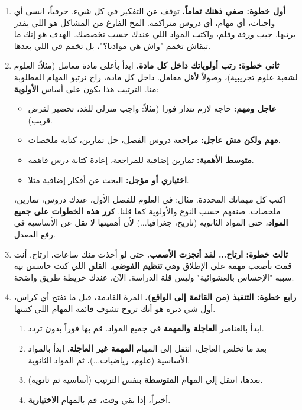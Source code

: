 \documentclass[12pt,a4paper]{book}
\begin{document}
	\begin{enumerate}
		\item \textbf{أول خطوة: صفي ذهنك تماماً.}
		توقف عن التفكير في كل شيء. حرفياً، انسى أي واجبات، أي مهام، أي دروس متراكمة. المخ الفارغ من المشاكل هو اللي يقدر يرتبها. جيب ورقة وقلم، واكتب المواد اللي عندك حسب تخصصك. الهدف هو إنك ما تبقاش تخمم "واش هي موادنا؟"، بل تخمم في اللي بعدها.
		
		\item \textbf{ثاني خطوة: رتب أولوياتك داخل كل مادة.}
		ابدأ بأعلى مادة معامل (مثلاً: العلوم لشعبة علوم تجريبية)، وصولاً لأقل معامل. داخل كل مادة، راح نرتبو المهام المطلوبة منا. الترتيب هذا يكون على أساس \textbf{الأولوية}:
		\begin{itemize}
			\item \textbf{عاجل ومهم:} حاجة لازم تتدار فورا (مثلاً: واجب منزلي للغد، تحضير لفرض قريب).
			\item \textbf{مهم ولكن مش عاجل:} مراجعة دروس الفصل، حل تمارين، كتابة ملخصات.
			\item \textbf{متوسط الأهمية:} تمارين إضافية للمراجعة، إعادة كتابة درس فاهمه.
			\item \textbf{اختياري أو مؤجل:} البحث عن أفكار إضافية مثلا.
		\end{itemize}
		اكتب كل مهماتك المحددة. مثال: في العلوم للفصل الأول، عندك دروس، تمارين، ملخصات. صنفهم حسب النوع والأولوية كما قلنا. \textbf{كرر هذه الخطوات على جميع المواد}، حتى المواد الثانوية (تاريخ، جغرافيا...) لأن أهميتها لا تقل عن الأساسية في رفع المعدل.
		
		\item \textbf{ثالث خطوة: ارتاح... لقد أنجزت الأصعب.}
		حتى لو أخذت منك ساعات، ارتاح. أنت قمت بأصعب مهمة على الإطلاق وهي \textbf{تنظيم الفوضى}. القلق اللي كنت حاسس بيه سببه "الإحساس بالعشوائية" وليس قلة الدراسة. الآن، عندك خريطة طريق واضحة.
		
		\item \textbf{رابع خطوة: التنفيذ (من القائمة إلى الواقع).}
		المرة القادمة، قبل ما تفتح أي كراس، أول شي ديره هو أنك تروح تشوف قائمة المهام اللي كتبتها.
		\begin{enumerate}
			\item ابدأ بالعناصر \textbf{العاجلة والمهمة} في جميع المواد. قم بها فوراً بدون تردد.
			\item بعد ما تخلص العاجل، انتقل إلى المهام \textbf{المهمة غير العاجلة}. ابدأ بالمواد الأساسية (علوم، رياضيات...)، ثم المواد الثانوية.
			\item بعدها، انتقل إلى المهام \textbf{المتوسطة} بنفس الترتيب (أساسية ثم ثانوية).
			\item أخيراً، إذا بقي وقت، قم بالمهام \textbf{الاختيارية}.
		\end{enumerate}
	\end{enumerate}
	
\end{document}
